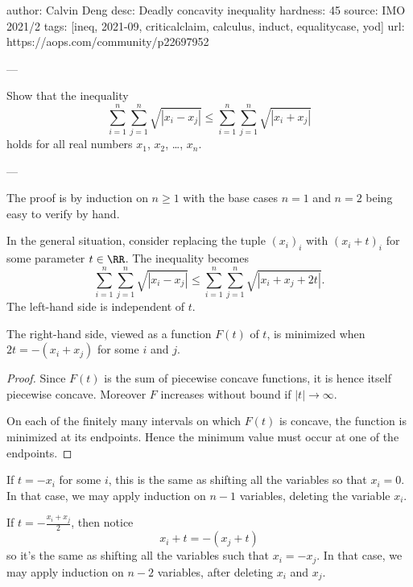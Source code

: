 author: Calvin Deng
desc: Deadly concavity inequality
hardness: 45
source: IMO 2021/2
tags: [ineq, 2021-09, criticalclaim, calculus, induct, equalitycase, yod]
url: https://aops.com/community/p22697952

---

Show that the inequality
\[\sum_{i=1}^n \sum_{j=1}^n \sqrt{|x_i-x_j|}
  \le \sum_{i=1}^n \sum_{j=1}^n \sqrt{|x_i+x_j|} \]
holds for all real numbers $x_1$, $x_2$, \dots, $x_n$.

---

The proof is by induction on $n \ge 1$ with the base cases $n=1$ and
$n=2$ being easy to verify by hand.

In the general situation, consider replacing the tuple $(x_i)_i$
with $(x_i+t)_i$ for some parameter $t \in \RR$.
The inequality becomes
\[\sum_{i=1}^n \sum_{j=1}^n \sqrt{|x_i-x_j|}
  \le \sum_{i=1}^n \sum_{j=1}^n \sqrt{|x_i+x_j+2t|}. \]
The left-hand side is independent of $t$.
\begin{claim*}
  The right-hand side, viewed as a function $F(t)$ of $t$,
  is minimized when $2t = -(x_i + x_j)$ for some $i$ and $j$.
\end{claim*}
\begin{proof}
  Since $F(t)$ is the sum of piecewise concave functions,
  it is hence itself piecewise concave.
  Moreover $F$ increases without bound if $|t| \to \infty$.

  On each of the finitely many intervals on which $F(t)$ is
  concave, the function is minimized at its endpoints.
  Hence the minimum value must occur at one of the endpoints.
\end{proof}

If $t = -x_i$ for some $i$, this is the same as shifting all the
variables so that $x_i = 0$.
In that case, we may apply induction on $n-1$ variables,
deleting the variable $x_i$.

If $t = -\frac{x_i+x_j}{2}$, then notice
\[ x_i + t = -(x_j + t) \]
so it's the same as shifting all the variables such that $x_i = -x_j$.
In that case, we may apply induction on $n-2$ variables,
after deleting $x_i$ and $x_j$.
